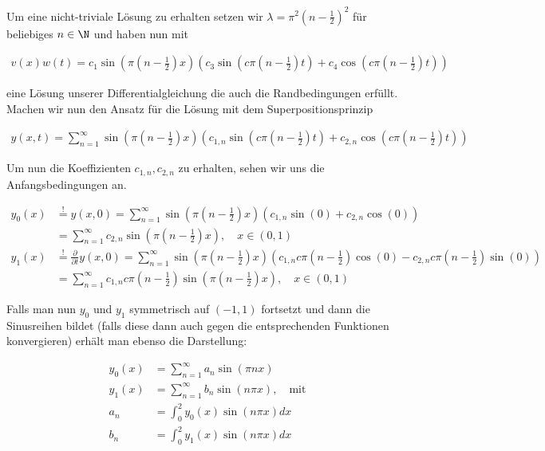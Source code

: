 \begin{solution}
Um eine nicht-triviale Lösung zu erhalten setzen wir $\lambda = \pi^2\left(n - \frac{1}{2}\right)^2$ für beliebiges $n \in \N$ und haben nun mit

\begin{align*}
  v(x)w(t)
  =
  c_1\sin\left(\pi\left(n - \frac{1}{2}\right) x\right)
  \left(c_3 \sin\left(c\pi\left(n - \frac{1}{2}\right)t\right) +
  c_4 \cos\left(c\pi\left(n - \frac{1}{2}\right)t\right)\right)
\end{align*}

eine Lösung unserer Differentialgleichung die auch die Randbedingungen erfüllt.
Machen wir nun den Ansatz für die Lösung mit dem Superpositionsprinzip

\begin{align*}
  y(x,t)
  =
  \sum_{n=1}^{\infty} \sin\left(\pi\left(n - \frac{1}{2}\right) x\right)
  \left(c_{1,n}\sin\left(c\pi\left(n - \frac{1}{2}\right) t\right)+c_{2,n}\cos\left(c\pi\left(n - \frac{1}{2}\right) t\right)\right)
\end{align*}

Um nun die Koeffizienten $c_{1,n},c_{2,n}$ zu erhalten, sehen wir uns die
Anfangsbedingungen an.

\begin{align*}
  y_0(x)
  &\stackrel{!}{=} y(x,0) = \sum_{n=1}^{\infty} \sin\left(\pi\left(n - \frac{1}{2}\right) x\right)
  \left(c_{1,n}\sin(0)+c_{2,n}\cos(0)\right) \\
  &= \sum_{n=1}^\infty c_{2,n}\sin\left(\pi\left(n - \frac{1}{2}\right) x\right),       \quad x \in (0,1) \\
  y_1(x)
  &\stackrel{!}{=}
  \frac{\partial}{\partial t}y(x,0) = \sum_{n=1}^{\infty} \sin\left(\pi\left(n - \frac{1}{2}\right) x\right)
  \left(c_{1,n}c\pi\left(n - \frac{1}{2}\right)\cos(0)- c_{2,n}c\pi\left(n - \frac{1}{2}\right)\sin(0)\right) \\
  &= \sum_{n=1}^\infty c_{1,n}c\pi\left(n - \frac{1}{2}\right)\sin\left(\pi\left(n - \frac{1}{2}\right) x\right),  \quad x \in (0,1)
\end{align*}

Falls man nun $y_0$ und $y_1$ symmetrisch auf $(-1,1)$
fortsetzt und dann die Sinusreihen bildet (falls diese dann auch gegen die entsprechenden Funktionen
konvergieren) erhält man ebenso die Darstellung:

\begin{align*}
  y_0(x)
  &=
  \sum_{n=1}^\infty a_n \sin(\pi nx) \\
  y_1(x)
  &=
  \sum_{n=1}^\infty b_n \sin(n \pi x), \quad \text{mit} \\
  a_n
  &=
  \int_0^2 y_0(x)\sin(n\pi x) dx \\
  b_n
  &=
  \int_0^2 y_1(x)\sin(n\pi x) dx \\
\end{align*}
\end{solution}
